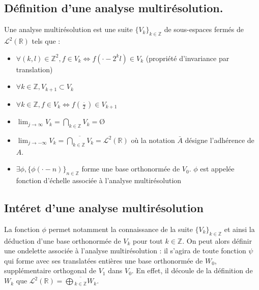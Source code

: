 \documentclass{article}
\begin{document}
\subsection{Définition d'une analyse multirésolution.}

Une analyse multirésolution est une suite $\{V_k\}_{k\in\mathbb{Z}}$ de sous-espaces fermés de $\mathcal{L}^2(\mathbb{R})$ tels que : \\

\begin{itemize}
\item $\forall{}(k,l) \in \mathbb{Z}^2, f \in V_k \Leftrightarrow f(\cdot - 2^{k}l) \in V_k $ (propriété d'invariance par translation)

\item $\forall k \in \mathbb{Z}, V_{k+1} \subset V_k$

\item $\forall k \in \mathbb{Z}, f \in V_k \Leftrightarrow f(\frac{\cdot}{2}) \in V_{k+1}$

\item $\displaystyle \lim_{j \to \infty} V_k = \bigcap_{k\in\mathbb{Z}}V_k = \textrm{Ø} $

\item $\displaystyle \lim_{j \to -\infty} V_k = \overline{\bigcap_{k\in\mathbb{Z}}V_k} = \mathcal{L}^2(\mathbb{R}) $ où la notation $\bar{A}$ désigne l'adhérence de $A$.

\item $\exists\phi, \{\phi(\cdot - n)\}_{n \in \mathbb{Z}}$ forme une base orthonormée de $V_0$. $\phi$ est appelée fonction d'échelle associée à l'analyse multirésolution
\end{itemize}

\subsection{Intéret d'une analyse multirésolution}

La fonction $\phi$ permet notamment la connaissance de la suite $\{V_k\}_{k\in\mathbb{Z}}$ et ainsi la déduction d'une base orthonormée de $V_k$ pour tout $k \in \mathbb{Z}$. On peut alors définir une ondelette associée à l'analyse multirésolution : il s'agira de toute fonction $\psi$ qui forme avec ses translatées entières une base orthonormée de $W_0$, supplémentaire orthogonal de $V_1$ dans $V_0$. En effet, il découle de la définition de $W_k$ que $\displaystyle \mathcal{L}^2(\mathbb{R}) = \overline{\bigoplus{}_{k\in\mathbb{Z}}W_k}$. \\
\end{document}
